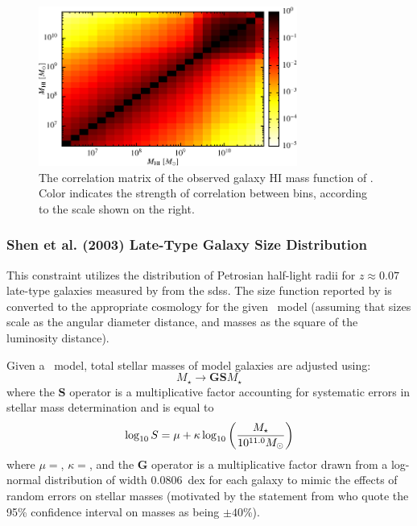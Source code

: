 \begin{figure}
 \includegraphics[width=85mm,trim=0mm 0mm 0mm 0mm,clip]{Plots/DataAnalysis/alfalfaHICorrelationmatrix.pdf}
 \caption{The correlation matrix of the observed galaxy HI mass function of \protect\cite{martin_arecibo_2010}. Color indicates the strength of correlation between bins, according to the scale shown on the right.}
 \label{fig:CorrelationMatrixALFALFA}
\end{figure}

\subsubsection{Shen et al. (2003) Late-Type Galaxy Size Distribution}\label{sec:SDSSLateTypeGalaxySizeDistribution}

This constraint utilizes the distribution of Petrosian half-light radii for $z\approx 0.07$ late-type galaxies measured by \cite{shen_size_2003} from the \gls{sdss}. The size function reported by \cite{shen_size_2003} is converted to the appropriate cosmology for the given \glc\ model (assuming that sizes scale as the angular diameter distance, and masses as the square of the luminosity distance).

Given a \glc\ model, total stellar masses of model galaxies are adjusted using:
\begin{equation}
 M_\star \rightarrow \mathbf{G} \mathbf{S} M_\star 
\end{equation}
where the $\mathbf{S}$ operator is a multiplicative factor accounting for systematic errors in stellar mass determination and is equal to \citep{behroozi_comprehensive_2010}
\begin{equation}
 \log_\mathrm{10} S = \mu + \kappa \log_\mathrm{10} \left({M_\star \over 10^{11.0}M_\odot}\right)
\end{equation}
where $\mu=${\normalfont {}}, $\kappa=${\normalfont {}}, and the {\normalfont \bfseries G} operator is a multiplicative factor drawn from a log-normal distribution of width $0.0806$~dex for each galaxy to mimic the effects of random errors on stellar masses (motivated by the statement from \cite{shen_size_2003} who quote the 95\% confidence
interval on masses as being $\pm 40$\%).

